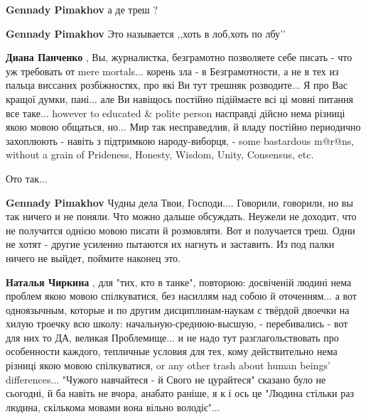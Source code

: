 \begin{itemize}
\begin{itemize}
\textbf{Gennady Pimakhov} а де треш ?

 
\textbf{Gennady Pimakhov} Это называется ,,хоть в лоб,хоть по лбу’’

 
\textbf{Диана Панченко} , Вы, журналистка, безграмотно позволяете себе писать -
что уж требовать от mere mortals... корень зла - в Безграмотности, а не в тех
из пальца виссаних розбіжностях, про які Ви тут трешняк розводите... Я про Вас
кращої думки, пані... але Ви навіщось постійно підіймаєте всі ці мовні питання
все таке... however to educated \& polite person насправді дійсно нема різниці
якою мовою общаться, но... Мир так несправедлив, й владу постійно периодично
захоплюють - навіть з підтримкою народу-виборця, - some bastardous m@r@ns,
without a grain of Prideness, Honesty, Wisdom, Unity, Consensus, etc.

Ото так...

 
\textbf{Gennady Pimakhov} Чудны дела Твои, Господи.... Говорили, говорили, но вы
так ничего и не поняли. Что можно дальше обсуждать. Неужели не доходит, что не
получится однією мовою писати й розмовляти. Вот и получается треш. Одни не
хотят - другие усиленно пытаются их нагнуть и заставить. Из под палки ничего не
выйдет, поймите наконец это.

 
\textbf{Наталья Чиркина} , для "тих, кто в танке", повторюю: досвіченій людині
нема проблем якою мовою спілкуватися, без насиллям над собою й оточенням... а
вот одноязычным, которые и по другим дисциплинам-наукам с твёрдой двоечки на
хилую троечку всю школу: начальную-среднюю-высшую, - перебивались - вот для них
то ДА, великая Проблемище... и не надо тут разглагольствовать про особенности
каждого, тепличные условия для тех, кому действительно нема різниці якою мовою
спілкуватися, or any other trash about human beings' differences... "Чужого
навчайтеся - й Свого не цурайтеся" сказано було не сьогодні, й ба навіть не
вчора, анабато раніше, я к і ось це "Людина стільки раз людина, скількома
мовами вона вільно володіє"...


\end{itemize}
\end{itemize}
